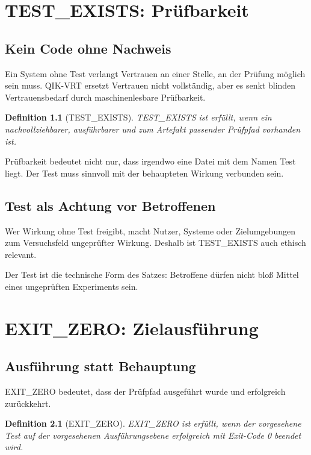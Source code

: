 \documentclass[11pt,a4paper,oneside]{book}
\newtheorem{definition}{Definition}[chapter]
\begin{document}
\chapter{TEST\_EXISTS: Prüfbarkeit}

\section{Kein Code ohne Nachweis}

Ein System ohne Test verlangt Vertrauen an einer Stelle, an der Prüfung möglich sein muss. QIK-VRT ersetzt Vertrauen nicht vollständig, aber es senkt blinden Vertrauensbedarf durch maschinenlesbare Prüfbarkeit.

\begin{definition}[TEST\_EXISTS]
TEST\_EXISTS ist erfüllt, wenn ein nachvollziehbarer, ausführbarer und zum Artefakt passender Prüfpfad vorhanden ist.
\end{definition}

Prüfbarkeit bedeutet nicht nur, dass irgendwo eine Datei mit dem Namen Test liegt. Der Test muss sinnvoll mit der behaupteten Wirkung verbunden sein.

\section{Test als Achtung vor Betroffenen}

Wer Wirkung ohne Test freigibt, macht Nutzer, Systeme oder Zielumgebungen zum Versuchsfeld ungeprüfter Wirkung. Deshalb ist TEST\_EXISTS auch ethisch relevant.

Der Test ist die technische Form des Satzes: Betroffene dürfen nicht bloß Mittel eines ungeprüften Experiments sein.

\chapter{EXIT\_ZERO: Zielausführung}

\section{Ausführung statt Behauptung}

EXIT\_ZERO bedeutet, dass der Prüfpfad ausgeführt wurde und erfolgreich zurückkehrt.

\begin{definition}[EXIT\_ZERO]
EXIT\_ZERO ist erfüllt, wenn der vorgesehene Test auf der vorgesehenen Ausführungsebene erfolgreich mit Exit-Code 0 beendet wird.
\end{definition}
\end{document}
